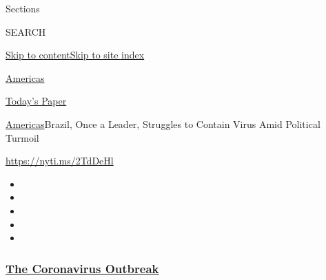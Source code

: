 Sections

SEARCH

\protect\hyperlink{site-content}{Skip to
content}\protect\hyperlink{site-index}{Skip to site index}

\href{https://www.nytimes3xbfgragh.onion/section/world/americas}{Americas}

\href{https://myaccount.nytimes3xbfgragh.onion/auth/login?response_type=cookie\&client_id=vi}{}

\href{https://www.nytimes3xbfgragh.onion/section/todayspaper}{Today's
Paper}

\href{/section/world/americas}{Americas}\textbar{}Brazil, Once a Leader,
Struggles to Contain Virus Amid Political Turmoil

\url{https://nyti.ms/2TdDeHl}

\begin{itemize}
\item
\item
\item
\item
\item
\end{itemize}

\hypertarget{the-coronavirus-outbreak}{%
\subsubsection{\texorpdfstring{\href{https://www.nytimes3xbfgragh.onion/news-event/coronavirus?name=styln-coronavirus-national\&region=TOP_BANNER\&variant=undefined\&block=storyline_menu_recirc\&action=click\&pgtype=Article\&impression_id=8b367dc0-e3a3-11ea-94af-ff08e013db7e}{The
Coronavirus
Outbreak}}{The Coronavirus Outbreak}}\label{the-coronavirus-outbreak}}

